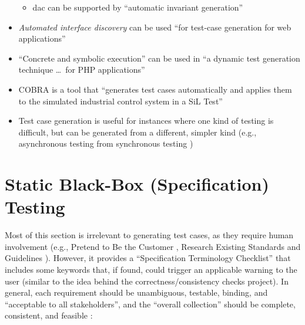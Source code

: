 \begin{itemize}
\begin{itemize}
                  \item \acf{dac} can be supported by ``automatic invariant
                        generation'' \citep[p.~345]{LahiriEtAl2013}
            \end{itemize}
      \item \emph{Automated interface discovery} can be used ``for test-case
            generation for web applications'' \citep[p.~184]{DoğanEtAl2014}
      \item ``Concrete and symbolic execution'' can be used in ``a dynamic test
            generation technique \dots\ for PHP applications''
            \citep[p.~192]{DoğanEtAl2014} 
      \item COBRA is a tool that ``generates test cases automatically and
            applies them to the simulated industrial control system in a SiL
            Test'' \citep[p.~2]{PreußeEtAl2012}
      \item Test case generation is useful for instances where one kind of
            testing is difficult, but can be generated from a different,
            simpler kind (e.g., asynchronous testing from synchronous testing
            \citep{JardEtAl1999})
\end{itemize}

\section[Static Black-Box (Specification) Testing]{Static Black-Box
  (Specification) Testing \citep[pp.~56-62]{Patton2006}}

Most of this section is irrelevant to generating test cases, as they require
human involvement  (e.g., Pretend to Be the Customer
\citep[pp.~57-58]{Patton2006}, Research Existing Standards and
Guidelines \citep[pp.~58-59]{Patton2006}). However, it provides a
``Specification Terminology Checklist'' \citep[p.~61]{Patton2006} that
includes some keywords that, if found, could trigger an applicable warning to
the user (similar to the idea behind the correctness/consistency checks
project). In general, each requirement should be unambiguous, testable,
binding, and ``acceptable to all stakeholders'', and the ``overall collection''
should be complete, consistent, and feasible \citep[p.~1-8]{SWEBOK2024}:

